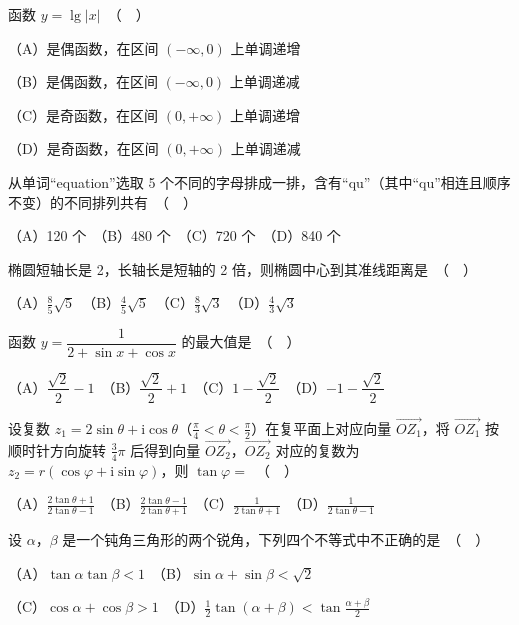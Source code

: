 \begin{question}
函数 $y = \lg |x|$　（　）

（A）是偶函数，在区间 $(-\infty, 0)$ 上单调递增

（B）是偶函数，在区间 $(-\infty, 0)$ 上单调递减

（C）是奇函数，在区间 $(0, +\infty)$ 上单调递增

（D）是奇函数，在区间 $(0, +\infty)$ 上单调递减

\end{question}
\begin{question}
从单词“equation”选取 5 个不同的字母排成一排，含有“qu”（其中“qu”相连且顺序不变）的不同排列共有　（　）

（A）120 个　（B）480 个　（C）720 个　（D）840 个

\end{question}
\begin{question}
椭圆短轴长是 2，长轴长是短轴的 2 倍，则椭圆中心到其准线距离是　（　）

（A）$\frac{8}{5}\sqrt{5}$　（B）$\frac{4}{5}\sqrt{5}$　（C）$\frac{8}{3}\sqrt{3}$　（D）$\frac{4}{3}\sqrt{3}$

\end{question}
\begin{question}
函数 $y = \dfrac{1}{2 + \sin x + \cos x}$ 的最大值是　（　）

（A）$\dfrac{\sqrt{2}}{2} - 1$　（B）$\dfrac{\sqrt{2}}{2} + 1$　（C）$1 - \dfrac{\sqrt{2}}{2}$　（D）$-1 - \dfrac{\sqrt{2}}{2}$

\end{question}
\begin{question}
设复数 $z_1 = 2\sin\theta + \mathrm{i}\cos\theta$（$\frac{\pi}{4} < \theta < \frac{\pi}{2}$）在复平面上对应向量 $\overrightarrow{OZ_1}$，将 $\overrightarrow{OZ_1}$ 按顺时针方向旋转 $\frac{3}{4}\pi$ 后得到向量 $\overrightarrow{OZ_2}$，$\overrightarrow{OZ_2}$ 对应的复数为 $z_2 = r(\cos\varphi + \mathrm{i}\sin\varphi)$，则 $\tan\varphi =$　（　）

（A）$\frac{2\tan\theta + 1}{2\tan\theta - 1}$　（B）$\frac{2\tan\theta - 1}{2\tan\theta + 1}$　（C）$\frac{1}{2\tan\theta + 1}$　（D）$\frac{1}{2\tan\theta - 1}$

\end{question}
\begin{question}
设 $\alpha$，$\beta$ 是一个钝角三角形的两个锐角，下列四个不等式中不正确的是　（　）

（A）$\tan\alpha\tan\beta < 1$　（B）$\sin\alpha + \sin\beta < \sqrt{2}$

（C）$\cos\alpha + \cos\beta > 1$　（D）$\frac{1}{2}\tan(\alpha+\beta) < \tan\frac{\alpha+\beta}{2}$

\end{question}
